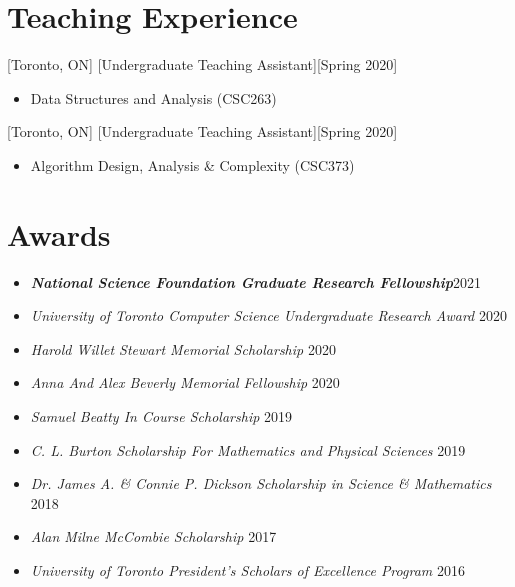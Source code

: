 \documentclass{article}
\begin{document}
    \section{Teaching Experience}
    [Toronto, ON]
    [Undergraduate Teaching Assistant][Spring 2020]
    \begin{itemize}
        \item Data Structures and Analysis (CSC263)
    \end{itemize}

    [Toronto, ON]
    [Undergraduate Teaching Assistant][Spring 2020]
    \begin{itemize}
        \item Algorithm Design, Analysis \& Complexity (CSC373)
    \end{itemize}


    \section{Awards}
    \begin{itemize}
     \setlength\itemsep{1ex}
    	\item \textbf{\textsl{National Science Foundation Graduate Research Fellowship}}\hfill 2021
        \item \textsl{University of Toronto Computer Science Undergraduate Research Award} \hfill 2020
        \item \textsl{Harold Willet Stewart Memorial Scholarship} \hfill 2020
        \item \textsl{Anna And Alex Beverly Memorial Fellowship} \hfill 2020
        \item \textsl{Samuel Beatty In Course Scholarship} \hfill 2019
        \item \textsl{C. L. Burton Scholarship For Mathematics and Physical Sciences} \hfill 2019
        \item \textsl{Dr. James A. \& Connie P. Dickson Scholarship in Science \& Mathematics} \hfill 2018
        \item \textsl{Alan Milne McCombie Scholarship} \hfill 2017
        \item \textsl{University of Toronto President's Scholars of Excellence Program} \hfill 2016
    \end{itemize}
\end{document}
